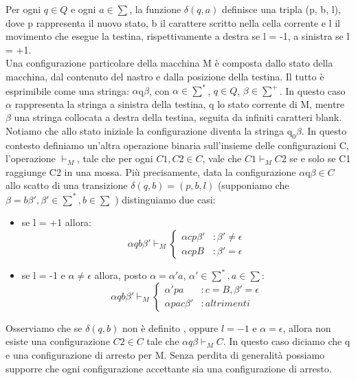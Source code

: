 Per ogni $q \in Q$ e ogni $a \in \sum$, la funzione $\delta(q, a)$ definisce una tripla (p, b, l), dove p rappresenta il nuovo stato, b il carattere scritto nella cella corrente e l il movimento che esegue la testina, rispettivamente a destra se l = -1, a sinistra se l = +1.\\
Una configurazione particolare della macchina M è composta dallo stato della macchina, dal contenuto del nastro e dalla posizione della testina. Il tutto è esprimibile come una stringa: $\alpha$q$\beta$, con $\alpha \in \sum^*$, $q \in Q$, $\beta \in \sum^+$. In questo caso $\alpha$ rappresenta la stringa a sinistra della testina, q lo stato corrente di M, mentre $\beta$ una stringa collocata a destra della testina, seguita da infiniti caratteri blank. Notiamo che allo stato iniziale la configurazione diventa la stringa $\mathrm{q}_{0} \beta$. In questo contesto definiamo un'altra operazione binaria sull'insieme delle configurazioni C, l'operazione $\vdash_{M}$, tale che per ogni $C1, C2 \in C$, vale che $C1 \vdash_{M} C2$ se e solo se C1 raggiunge C2 in una mossa. Più precisamente, data la configurazione $\alpha$q$\beta \in C$ allo scatto di una transizione $\delta(q, b) = (p, b, l)$ (supponiamo che $\beta = b\beta', \beta' \in \sum^*, b \in \sum$ ) distinguiamo due casi:\\
\begin{itemize}
\item{se l = +1 allora:}
\[\alpha qb \beta' \vdash_{M} \left\{
  \begin{array}{lr}
    \alpha cp \beta' & : \beta' \neq \epsilon\\
    \alpha cpB & : \beta' = \epsilon
  \end{array}
\right.
\]
\item{se l = -1 e $\alpha \neq \epsilon$ allora, posto $\alpha = \alpha' a $, $\alpha' \in \sum^*, a \in \sum$:}
\[\alpha qb \beta' \vdash_{M} \left\{
  \begin{array}{lr}
    \alpha' pa & : c = B, \beta' = \epsilon\\
    \alpha pac\beta' & : altrimenti
  \end{array}
\right.
\]
\end{itemize}
Osserviamo che se $\delta(q,b)$ non è definito , oppure $l = -1$ e $\alpha = \epsilon$, allora non esiste una configurazione $C2 \in C$ tale che $\alpha q \beta \vdash_{M} C$. In questo caso diciamo che q e una configurazione di arresto per M. Senza perdita di generalità possiamo supporre che ogni configurazione accettante sia una configurazione di arresto.\\
